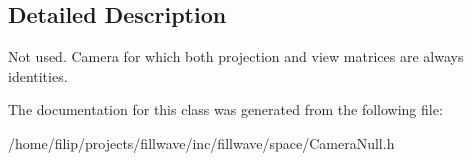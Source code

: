 \subsection{Detailed Description}
Not used. Camera for which both projection and view matrices are always identities. 

The documentation for this class was generated from the following file\+:\begin{DoxyCompactItemize}
\item 
/home/filip/projects/fillwave/inc/fillwave/space/Camera\+Null.\+h\end{DoxyCompactItemize}
